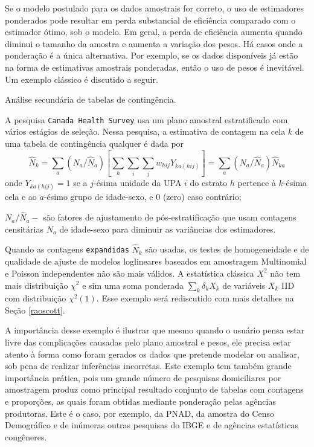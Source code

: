 \documentclass[]{book}
\numberwithin{example}{chapter}
\numberwithin{remark}{chapter}
\numberwithin{definition}{chapter}
\let\BeginKnitrBlock\begin \let\EndKnitrBlock\end
\begin{document}
Se o modelo postulado para os dados amostrais for correto, o uso de
estimadores ponderados pode resultar em perda substancial de eficiência
comparado com o estimador ótimo, sob o modelo. Em geral, a perda de
eficiência aumenta quando diminui o tamanho da amostra e aumenta a
variação dos pesos. Há casos onde a ponderação é a única alternativa.
Por exemplo, se os dados disponíveis já estão na forma de estimativas
amostrais ponderadas, então o uso de pesos é inevitável. Um exemplo
clássico é discutido a seguir.

\BeginKnitrBlock{example}
\protect\hypertarget{ex:Analisec}{}{\label{ex:Analisec}}Análise secundária
de tabelas de contingência.
\EndKnitrBlock{example}

A pesquisa \texttt{Canada\ Health\ Survey} usa um plano amostral
estratificado com vários estágios de seleção. Nessa pesquisa, a
estimativa de contagem na cela \(k\) de uma tabela de contingência
qualquer é dada por \[
\widehat{N}_{k}=\sum_{a}\left( N_{a}/\widehat{N}_{a}\right) \left[
\sum_{h}\sum_{i}\sum_{j}w_{hij}Y_{ka\left( hij\right) }\right]
=\sum_{a}\left( N_{a}/\widehat{N}_{a}\right) \widehat{N}_{ka} 
\] onde \(Y_{ka\left( hij\right)}=1\) se a \(j\)-ésima unidade da UPA
\(i\) do estrato \(h\) pertence à \(k\)-ésima cela e ao \(a\)-ésimo
grupo de idade-sexo, e \(0\) (zero) caso contrário;

\(N_{a}/\widehat{N}_{a}-\) são fatores de ajustamento de
pós-estratificação que usam contagens censitárias \(N_{a}\) de
idade-sexo para diminuir as variâncias dos estimadores.

Quando as contagens \texttt{expandidas} \(\widehat{N}_{k}\) são usadas,
os testes de homogeneidade e de qualidade de ajuste de modelos
loglineares baseados em amostragem Multinomial e Poisson independentes
não são mais válidos. A estatística clássica \(X^{2}\) não tem mais
distribuição \(\chi ^{2}\) e sim uma soma ponderada
\(\sum_{k}\delta _{k}X_{k}\) de variáveis \(X_{k}\) IID com distribuição
\(\chi ^{2}\left( 1\right)\). Esse exemplo será rediscutido com mais
detalhes na Seção \ref{raoscott}.

A importância desse exemplo é ilustrar que mesmo quando o usuário pensa
estar livre das complicações causadas pelo plano amostral e pesos, ele
precisa estar atento à forma como foram gerados os dados que pretende
modelar ou analisar, sob pena de realizar inferências incorretas. Este
exemplo tem também grande importância prática, pois um grande número de
pesquisas domiciliares por amostragem produz como principal resultado
conjunto de tabelas com contagens e proporções, as quais foram obtidas
mediante ponderação pelas agências produtoras. Este é o caso, por
exemplo, da PNAD, da amostra do Censo Demográfico e de inúmeras outras
pesquisas do IBGE e de agências estatísticas congêneres.
\end{document}
